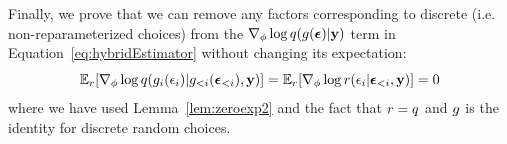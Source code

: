 Finally, we prove that we can remove any factors corresponding to discrete (i.e. non-reparameterized choices) from the $\nabla_\phi \log q(g(\bm{\epsilon}) | \mathbf{y})$ term in Equation~\ref{eq:hybridEstimator} without changing its expectation:
\begin{equation*}
\expect_\reparamDist [ \gradparams \log \guide(\reparamXform_i(\reparamVar_i) | \reparamXform_{<i}(\reparamVars_{<i}), \observedVars) ]
%
= \expect_\reparamDist [ \gradparams \log \reparamDist(\reparamVar_i | \reparamVars_{<i}, \observedVars) ]
%
= 0
\end{equation*}
where we have used Lemma~\ref{lem:zeroexp2} and the fact that $r = q$ and $g$ is the identity for discrete random choices.
